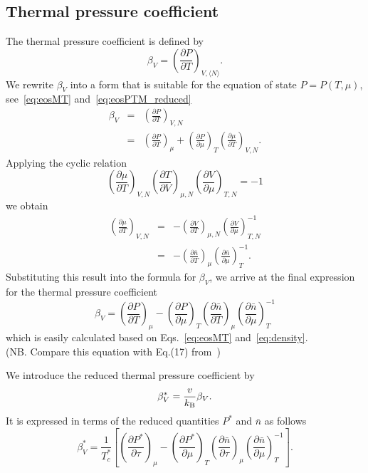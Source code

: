 \documentclass[12pt]{article}
\begin{document}
	\subsection{Thermal pressure coefficient}
	The thermal pressure coefficient is defined by
	\begin{equation}
		\label{def:therm_pres_coef}
		\beta_V = \left( \frac{\partial P}{\partial T} \right)_{V,\langle N \rangle}.
	\end{equation}
	We rewrite $\beta_V$ into a form that is suitable for the equation of state $P=P(T,\mu)$, see~\eqref{eq:eosMT} and~\eqref{eq:eosPTM_reduced}
	\begin{eqnarray}
		\beta_V & = & \left(\frac{\partial P}{\partial T}\right)_{V, N}
		\nonumber\\
		& = & \left(\frac{\partial P}{\partial T}\right)_{\mu} + \left(\frac{\partial P}{\partial \mu}\right)_T \left(\frac{\partial \mu}{\partial T}\right)_{V, N}.
	\end{eqnarray}
	Applying the cyclic relation
	\begin{equation*}
		\left(\frac{\partial \mu}{\partial T}\right)_{V, N} 
		\left(\frac{\partial T}{\partial V}\right)_{\mu, N}
		\left(\frac{\partial V}{\partial \mu}\right)_{T, N}
		= -1
	\end{equation*}
	we obtain
	\begin{eqnarray*}
		\left(\frac{\partial \mu}{\partial T}\right)_{V, N} 
		& = & 
		- \left(\frac{\partial V}{\partial T}\right)_{\mu, N} 
		\left(\frac{\partial V}{\partial \mu}\right)^{-1}_{T, N} \\
		& = & - \left(\frac{\partial \bar{n}}{\partial T}\right)_{\mu}
		\left(\frac{\partial \bar{n}}{\partial \mu}\right)^{-1}_{T}.		
	\end{eqnarray*}
	Substituting this result into the formula for $\beta_V$, we arrive at the final expression for the thermal pressure coefficient
	\begin{equation}
		\beta_V = \left(\frac{\partial P}{\partial T}\right)_{\mu} 
		- \left(\frac{\partial P}{\partial \mu}\right)_T 
		\left(\frac{\partial \bar{n}}{\partial T}\right)_{\mu}
		\left(\frac{\partial \bar{n}}{\partial \mu}\right)^{-1}_{T}
	\end{equation}
	which is easily calculated based on Eqs.~\eqref{eq:eosMT} and~\eqref{eq:density}.\\
	(NB. Compare this equation with Eq.(17) from~\cite{StrokerMeier2021})
	
	We introduce the reduced thermal pressure coefficient by
	\begin{equation}
		\beta^*_V = \frac{v}{k_{\rm B}}\beta_V.
	\end{equation}
	It is expressed in terms of the reduced quantities $P^*$ and $\bar{n}$ as follows
	\begin{equation}
		\label{eq:beta_star_m}
		\beta^*_V = \frac{1}{T^*_c} 
		\left[ \left(\frac{\partial P^*}{\partial \tau}\right)_{\mu} 
		- \left(\frac{\partial P^*}{\partial \mu}\right)_T 
		\left(\frac{\partial \bar{n}}{\partial \tau}\right)_{\mu}
		\left(\frac{\partial \bar{n}}{\partial \mu}\right)^{-1}_{T} 
		\right].
	\end{equation}
	
\end{document}

